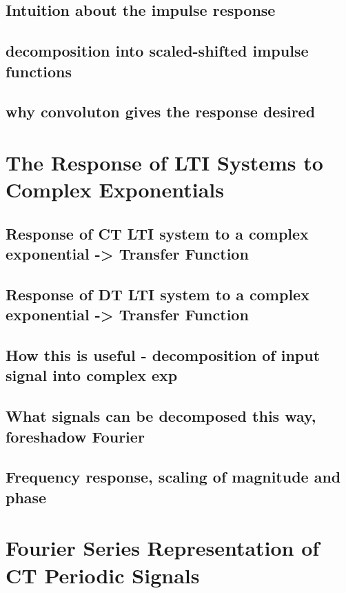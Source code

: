 \documentclass{article}
\begin{document}
\subsection{Intuition about the impulse response}
\label{sec:org8432368}
\subsection{decomposition into scaled-shifted impulse functions}
\label{sec:org23917a7}
\subsection{why convoluton gives the response desired}
\label{sec:org7ad3b62}

\newpage
\section{The Response of LTI Systems to Complex Exponentials}
\label{sec:org0d3d3bf}
\subsection{Response of CT LTI system to a complex exponential -> Transfer Function}
\label{sec:orgee51d0b}
\subsection{Response of DT LTI system to a complex exponential -> Transfer Function}
\label{sec:org7ba724a}
\subsection{How this is useful - decomposition of input signal into complex exp}
\label{sec:orge0520a1}
\subsection{What signals can be decomposed this way, foreshadow Fourier}
\label{sec:org097310e}
\subsection{Frequency response, scaling of magnitude and phase}
\label{sec:org9ebea42}

\newpage
\section{Fourier Series Representation of CT Periodic Signals}
\label{sec:org651d66d}
\end{document}

